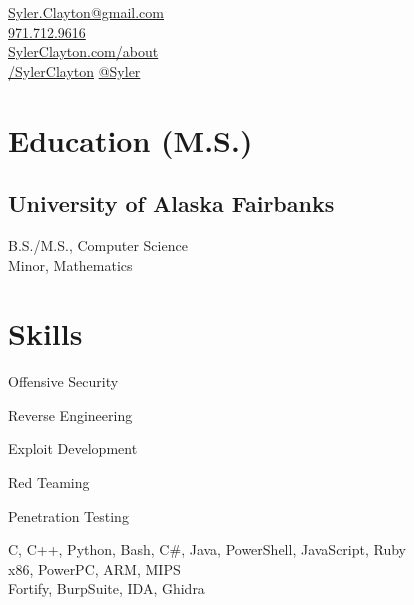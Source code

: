 \documentclass[]{hieudo-build}
\begin{document}
	
	{
		\faEnvelope\href{mailto:syler.clayton@gmail.com}{ Syler.Clayton@gmail.com}\\
		\faPhone \href{tel:+19717129616}{971.712.9616}
		\\
		\faGlobe\href{http://sylerclayton.com/about}{ SylerClayton.com/about}\\
		\faLinkedin\href{https://www.linkedin.com/in/sylerclayton}{ /SylerClayton}
		\faMastodon\href{https://infosec.exchange/@syler}{@Syler}
	}
	
	\begin{minipage}[t]{0.34\textwidth} 
		
		\section{Education (M.S.)} 
		
		\subsection{University of Alaska Fairbanks}
		B.S./M.S., Computer Science \\
		Minor, Mathematics
		
		\section{Skills}
		\begin{tightemize}
		\item Offensive Security
		\item Reverse Engineering
		\item Exploit Development
		\item Red Teaming
		\item Penetration Testing
		\end{tightemize}
		C, C++, Python, Bash, C\#, Java, PowerShell, JavaScript, Ruby \\ 
		x86, PowerPC, ARM, MIPS\\
		Fortify, BurpSuite, IDA, Ghidra

\end{minipage}
\end{document}
